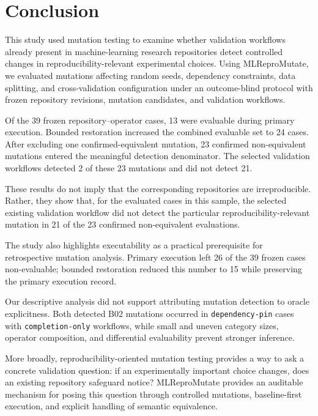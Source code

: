 \section{Conclusion}
\label{sec:conclusion}

This study used mutation testing to examine whether validation workflows
already present in machine-learning research repositories detect controlled
changes in reproducibility-relevant experimental choices. Using MLReproMutate,
we evaluated mutations affecting random seeds, dependency constraints, data
splitting, and cross-validation configuration under an outcome-blind protocol
with frozen repository revisions, mutation candidates, and validation
workflows.

Of the 39 frozen repository--operator cases, 13 were evaluable during primary
execution. Bounded restoration increased the combined evaluable set to 24
cases. After excluding one confirmed-equivalent mutation, 23 confirmed
non-equivalent mutations entered the meaningful detection denominator. The
selected validation workflows detected 2 of these 23 mutations and did not
detect 21.

These results do not imply that the corresponding repositories are
irreproducible. Rather, they show that, for the evaluated cases in this sample,
the selected existing validation workflow did not detect the particular
reproducibility-relevant mutation in 21 of the 23 confirmed non-equivalent
evaluations.

The study also highlights executability as a practical prerequisite for
retrospective mutation analysis. Primary execution left 26 of the 39 frozen
cases non-evaluable; bounded restoration reduced this number to 15 while
preserving the primary execution record.

Our descriptive analysis did not support attributing mutation detection to
oracle explicitness. Both detected B02 mutations occurred in
\texttt{dependency-pin} cases with \texttt{completion-only} workflows, while
small and uneven category sizes, operator composition, and differential
evaluability prevent stronger inference.

More broadly, reproducibility-oriented mutation testing provides a way to ask
a concrete validation question: if an experimentally important choice changes,
does an existing repository safeguard notice? MLReproMutate provides an
auditable mechanism for posing this question through controlled mutations,
baseline-first execution, and explicit handling of semantic equivalence.
